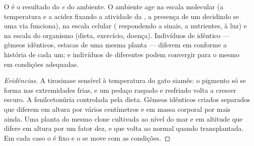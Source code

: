 \begin{proposition}\label{prop:g11:enzymes-and-phenotype:environment}
O  é o resultado do  \emph{e} do ambiente. O ambiente
age na escala molecular (a temperatura e a acidez fixando a atividade
da , a presença de um  decidindo se uma via funciona),
na escala celular ( respondendo a sinais, a nutrientes, à luz) e
na escala do organismo (dieta, exercício, doença). Indivíduos de
 idêntico --- gêmeos idênticos, estacas de uma mesma planta ---
diferem em  conforme a história de cada um; e indivíduos de
 diferentes podem convergir para o mesmo  em condições
adequadas.
\end{proposition}
\begin{proof}[Evidências]
A tirosinase sensível à temperatura do gato siamês: o pigmento só se
forma nas extremidades frias, e um pedaço raspado e resfriado volta a
crescer escuro. A fenilcetonúria controlada pela dieta. Gêmeos
idênticos criados separados que diferem em altura por vários
centímetros e em massa corporal por mais ainda. Uma planta do mesmo
clone cultivada ao nível do mar e em altitude que difere em altura por
um fator dez, e que volta ao normal quando transplantada. Em cada caso
o  é fixo e o  se move com as condições.
\end{proof}

